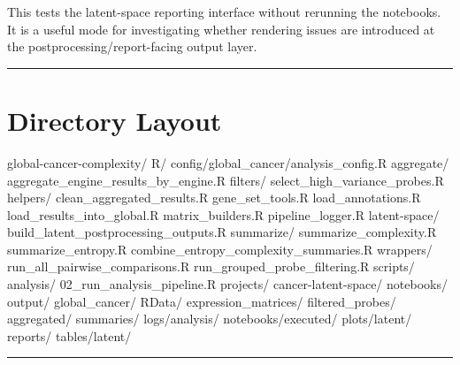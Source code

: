 \documentclass[
  letterpaper,
  DIV=11,
  numbers=noendperiod,
  openany,
  oneside]{scrreprt}
\newenvironment{Shaded}{\begin{snugshade}}{\end{snugshade}}
\newcommand{\NormalTok}[1]{\textcolor[rgb]{0.00,0.23,0.31}{#1}}
\begin{document}
This tests the latent-space reporting interface without rerunning the
notebooks. It is a useful mode for investigating whether rendering
issues are introduced at the postprocessing/report-facing output layer.

\begin{center}\rule{0.5\linewidth}{0.5pt}\end{center}

\section*{Directory Layout}\label{directory-layout-1}


\begin{Shaded}
\begin{Highlighting}[]
\NormalTok{global{-}cancer{-}complexity/}
\NormalTok{  R/}
\NormalTok{    config/global\_cancer/analysis\_config.R}
\NormalTok{    aggregate/}
\NormalTok{      aggregate\_engine\_results\_by\_engine.R}
\NormalTok{    filters/}
\NormalTok{      select\_high\_variance\_probes.R}
\NormalTok{    helpers/}
\NormalTok{      clean\_aggregated\_results.R}
\NormalTok{      gene\_set\_tools.R}
\NormalTok{      load\_annotations.R}
\NormalTok{      load\_results\_into\_global.R}
\NormalTok{      matrix\_builders.R}
\NormalTok{      pipeline\_logger.R}
\NormalTok{    latent{-}space/}
\NormalTok{      build\_latent\_postprocessing\_outputs.R}
\NormalTok{    summarize/}
\NormalTok{      summarize\_complexity.R}
\NormalTok{      summarize\_entropy.R}
\NormalTok{      combine\_entropy\_complexity\_summaries.R}
\NormalTok{    wrappers/}
\NormalTok{      run\_all\_pairwise\_comparisons.R}
\NormalTok{      run\_grouped\_probe\_filtering.R}
\NormalTok{  scripts/}
\NormalTok{    analysis/}
\NormalTok{      02\_run\_analysis\_pipeline.R}
\NormalTok{  projects/}
\NormalTok{    cancer{-}latent{-}space/}
\NormalTok{      notebooks/}
\NormalTok{  output/}
\NormalTok{    global\_cancer/}
\NormalTok{      RData/}
\NormalTok{        expression\_matrices/}
\NormalTok{        filtered\_probes/}
\NormalTok{        aggregated/}
\NormalTok{        summaries/}
\NormalTok{      logs/analysis/}
\NormalTok{      notebooks/executed/}
\NormalTok{      plots/latent/}
\NormalTok{      reports/}
\NormalTok{      tables/latent/}
\end{Highlighting}
\end{Shaded}

\begin{center}\rule{0.5\linewidth}{0.5pt}\end{center}
\end{document}
